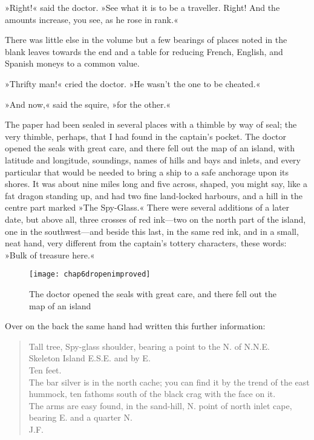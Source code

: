 »Right!« said the doctor. »See what it is to be a traveller. Right! And the amounts increase, you see, as he rose in rank.«

There was little else in the volume but a few bearings of places noted in the blank leaves towards the end and a table for reducing French, English, and Spanish moneys to a common value.

»Thrifty man!« cried the doctor. »He wasn't the one to be cheated.«

»And now,« said the squire, »for the other.«

 
The paper had been sealed in several places with a thimble by way of seal; the very thimble, perhaps, that I had found in the captain's pocket. The doctor opened the seals with great care, and there fell out the map of an island, with latitude and longitude, soundings, names of hills and bays and inlets, and every particular that would be needed to bring a ship to a safe anchorage upon its shores. It was about nine miles long and five across, shaped, you might say, like a fat dragon standing up, and had two fine land-locked harbours, and a hill in the centre part marked »The Spy-Glass.« There were several additions of a later date, but above all, three crosses of red ink—two on the north part of the island, one in the southwest—and beside this last, in the same red ink, and in a small, neat hand, very different from the captain's tottery characters, these words: »Bulk of treasure here.«


\begin{figure}[p]
\centering
\texttt{[image: chap6dropenimproved]}
\caption[There fell out the map of an island]{The doctor opened the seals with great care, and there fell out the map of an island}
\end{figure}

Over on the back the same hand had written this further information:

\blockquote{
Tall tree, Spy-glass shoulder, bearing a point to the N. of N.N.E.\\
Skeleton Island E.S.E. and by E.\\
Ten feet.\\
The bar silver is in the north cache; you can find it by the trend of the east hummock, ten fathoms south of the black crag with the face on it.\\
The arms are easy found, in the sand-hill, N. point of north inlet cape, bearing E. and a quarter N.\\
\textsc{J.F.}}


